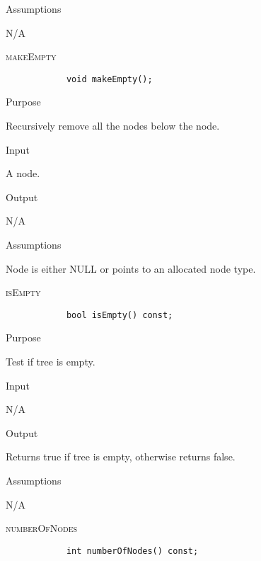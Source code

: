 \documentclass[pdftex, 12pt]{article}
\begin{document}
\begin{description}
\begin{description}
			\item{Assumptions}

				N/A

		\end{description}
	\item{\textsc{makeEmpty}}
		\begin{lstlisting}
			void makeEmpty();
		\end{lstlisting}
		\begin{description}

			\item{Purpose}
				
				Recursively remove all the nodes below the node.
			
			\item{Input}
			
				A node.

			\item{Output}

				N/A

			\item{Assumptions}

				Node is either NULL or points to an allocated node type.

		\end{description}
	\item{\textsc{isEmpty}}
		\begin{lstlisting}
			bool isEmpty() const;
		\end{lstlisting}
		\begin{description}

			\item{Purpose}

				Test if tree is empty.

			\item{Input}

				N/A

			\item{Output}

				Returns true if tree is empty, otherwise returns false.

			\item{Assumptions}

				N/A

		\end{description}
	\item{\textsc{numberOfNodes}}
		\begin{lstlisting}
			int numberOfNodes() const;
		\end{lstlisting}
		\begin{description}


\end{description}
\end{description}
\end{document}
